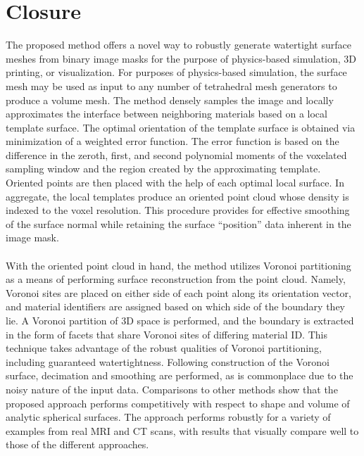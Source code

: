 \section{Closure}

The proposed method offers a novel way to robustly generate watertight surface meshes from binary image masks for the purpose of physics-based simulation, 3D printing, or visualization. For purposes of physics-based simulation, the surface mesh may be used as input to any number of tetrahedral mesh generators to produce a volume mesh. The method densely samples the image and locally approximates the interface between neighboring materials based on a local template surface. The optimal orientation of the template surface is obtained via minimization of a weighted error function. The error function is based on the difference in the zeroth, first, and second polynomial moments of the voxelated sampling window and the region created by the approximating template. Oriented points are then placed with the help of each optimal local surface. In aggregate, the local templates produce an oriented point cloud whose density is indexed to the voxel resolution. This procedure provides for effective smoothing of the surface normal while retaining the surface ``position'' data inherent in the image mask. \\ \\
%
With the oriented point cloud in hand, the method utilizes Voronoi partitioning as a means of performing surface reconstruction from the point cloud. Namely, Voronoi sites are placed on either side of each point along its orientation vector, and material identifiers are assigned based on which side of the boundary they lie. A Voronoi partition of 3D space is performed, and the boundary is extracted in the form of facets that share Voronoi sites of differing material ID. This technique takes advantage of the robust qualities of Voronoi partitioning, including guaranteed watertightness. Following construction of the Voronoi surface, decimation and smoothing are performed, as is commonplace due to the noisy nature of the input data. Comparisons to {other methods} show that the proposed approach performs competitively with respect to shape and volume of analytic spherical surfaces. The approach performs robustly for a variety of examples from real MRI and CT scans, with results that visually compare well to those of the {different approaches}. \\ \\
%

